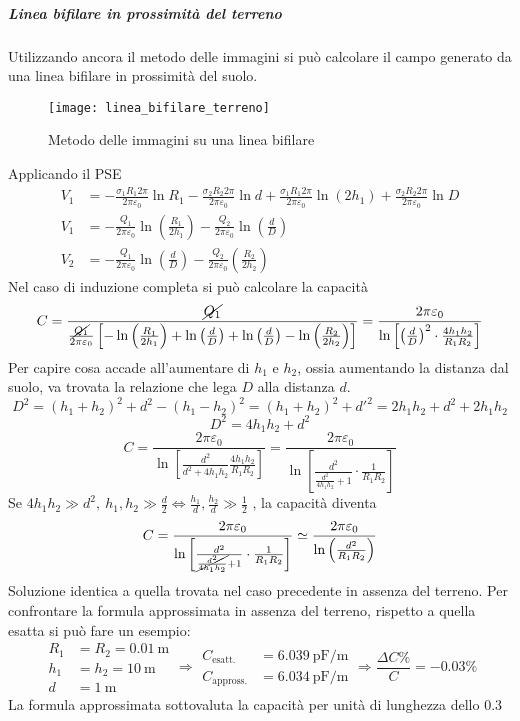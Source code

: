 \subparagraph{Linea bifilare in prossimità del terreno}
Utilizzando ancora il metodo delle immagini si può calcolare il campo generato da una linea
bifilare in prossimità del suolo.
\begin{figure}[h!]
\centering
 \texttt{[image: linea\_bifilare\_terreno]}
\caption{Metodo delle immagini su una linea bifilare}
\end{figure} 
Applicando il PSE
\begin{align*}
V_1 &= -\frac{\sigma_1 R_1 2\pi}{2\pi\varepsilon_0}\ln R_1 -
\frac{\sigma_2 R_2 2 \pi}{2 \pi \varepsilon_0}\ln d + 
\frac{\sigma_1 R_1 2 \pi}{2\pi \varepsilon_0} \ln(2 h_1) +
\frac{\sigma_2 R_2 2 \pi}{2\pi\varepsilon_0} \ln D \\
V_1 &= -\frac{Q_1}{2\pi\varepsilon_0} \ln\left(\frac{R_1}{2h_1}\right) - 
\frac{Q_2}{2\pi\varepsilon_0} \ln \left(\frac{d}{D}\right)\\
V_2 &= -\frac{Q_1}{2\pi\varepsilon_0} \ln\left(\frac{d}{D}\right) - 
\frac{Q_2}{2\pi\varepsilon_0} \left(\frac{R_2}{2h_2}\right)
\end{align*}
Nel caso di induzione completa si può calcolare la capacità
$$
C = \frac{\cancel{Q_1}}{\frac{\cancel{Q_1}}{2\pi\varepsilon_0}\left[-\ln\left(\frac{R_1}{2h_1}\right)+\ln\left(\frac{d}{D}\right)+\ln\left(\frac{d}{D}\right)-\ln\left(\frac{R_2}{2h_2}\right)\right]} = 
\frac{2\pi\varepsilon_0}{\ln\left[\left(\frac{d}{D}\right)^2\cdot\frac{4h_1h_2}{R_1R_2}\right]}
$$
Per capire cosa accade all'aumentare di $h_1$ e $h_2$, ossia aumentando
la distanza dal suolo, va trovata la relazione che lega $D$ alla 
distanza $d$.
$$
D^2 = (h_1+h_2)^2 + d^2 - (h_1-h_2)^2 = (h_1+h_2)^2 + d'^2 = 2h_1h_2 + d^2 + 2h_1h_2
$$ 
$$
D^2 = 4h_1h_2+d^2
$$
$$
C = \frac{2\pi\varepsilon_0}{\ln\left[\frac{d^2}{d^2+4h_1h_2} 
\frac{4h_1h_2}{R_1R_2} \right]} = \frac{2\pi\varepsilon_0}
{\ln\left[ \frac{d^2}{\frac{d^2}{4h_1h_2}+1}\cdot\frac{1}{R_1R_2} \right]}
$$
Se $4h_1h_2 \gg d^2,\ h_1,h_2 \gg \frac{d}{2} \Leftrightarrow \frac{h_1}{d},\frac{h_2}{d} \gg \frac{1}{2}$ , la capacità diventa
$$
C =\frac{2\pi\varepsilon_0}
{\ln\left[ \frac{d^2}{\cancel{\frac{d^2}{4h_1h_2}}+1}\cdot\frac{1}{R_1R_2} \right]} \simeq \frac{2\pi\varepsilon_0}{\ln\left(\frac{d^2}{R_1R_2}\right)}
$$
Soluzione identica a quella trovata nel caso precedente in
assenza del terreno.
Per confrontare la formula approssimata in assenza del terreno, rispetto a 
quella esatta si può fare un esempio:
$$
\begin{aligned}
R_1 &= R_2 = \SI{0.01}{\meter}\\
h_1 &= h_2 = \SI{10}{\meter} \\
d &= \SI{1}{\meter}
\end{aligned} \Rightarrow 
\begin{aligned}
C_{\text{esatt.}} &= \SI{6.039}{\pico\farad\per\meter} \\
C_{\text{appross.}} &= \SI{6.034}{\pico\farad\per\meter}
\end{aligned} \Rightarrow
\frac{\Delta C \% }{C} = -0.03 \%
$$
La formula approssimata sottovaluta la capacità per unità di lunghezza
dello 0.3 \textpertenthousand


